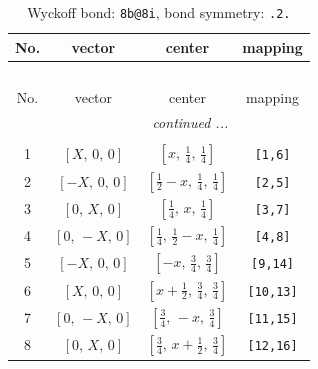 \documentclass[fleqn,8pt]{jsarticle}
\begin{document}
\begin{longtable}{cccc}
\caption{Wyckoff bond: {\tt 8b@8i}, bond symmetry: {\tt .2.}}
 \\
 \hline \hline
No. & vector & center & mapping \\ \hline \endfirsthead

\multicolumn{3}{l}{\tablename\ \thetable{}} \\
 \hline \hline
No. & vector & center & mapping \\ \hline \endhead

 \hline \hline
\multicolumn{3}{r}{\footnotesize\it continued ...} \\ \endfoot

 \hline \hline
\multicolumn{3}{r}{} \\ \endlastfoot

1 & $\left[ X,\, 0,\, 0 \right]$ & $\left[ x,\, \frac{1}{4},\, \frac{1}{4} \right]$ & {\tt [1,6]} \\ \hline
2 & $\left[ - X,\, 0,\, 0 \right]$ & $\left[ \frac{1}{2} - x,\, \frac{1}{4},\, \frac{1}{4} \right]$ & {\tt [2,5]} \\ \hline
3 & $\left[ 0,\, X,\, 0 \right]$ & $\left[ \frac{1}{4},\, x,\, \frac{1}{4} \right]$ & {\tt [3,7]} \\ \hline
4 & $\left[ 0,\, - X,\, 0 \right]$ & $\left[ \frac{1}{4},\, \frac{1}{2} - x,\, \frac{1}{4} \right]$ & {\tt [4,8]} \\ \hline
5 & $\left[ - X,\, 0,\, 0 \right]$ & $\left[ - x,\, \frac{3}{4},\, \frac{3}{4} \right]$ & {\tt [9,14]} \\ \hline
6 & $\left[ X,\, 0,\, 0 \right]$ & $\left[ x + \frac{1}{2},\, \frac{3}{4},\, \frac{3}{4} \right]$ & {\tt [10,13]} \\ \hline
7 & $\left[ 0,\, - X,\, 0 \right]$ & $\left[ \frac{3}{4},\, - x,\, \frac{3}{4} \right]$ & {\tt [11,15]} \\ \hline
8 & $\left[ 0,\, X,\, 0 \right]$ & $\left[ \frac{3}{4},\, x + \frac{1}{2},\, \frac{3}{4} \right]$ & {\tt [12,16]} \\
\end{longtable}
\renewcommand{\arraystretch}{1.2}
\end{document}
